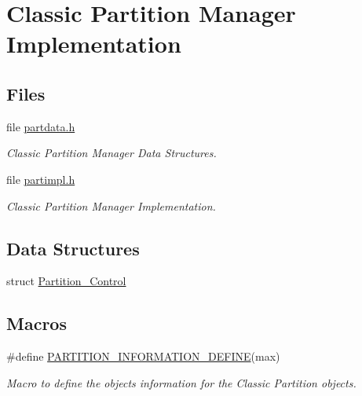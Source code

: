 \hypertarget{group__ClassicPartImpl}{}\section{Classic Partition Manager Implementation}
\label{group__ClassicPartImpl}
\subsection*{Files}
\begin{DoxyCompactItemize}
\item 
file \mbox{\hyperlink{partdata_8h}{partdata.\+h}}
\begin{DoxyCompactList}\small\item\em Classic Partition Manager Data Structures. \end{DoxyCompactList}\item 
file \mbox{\hyperlink{partimpl_8h}{partimpl.\+h}}
\begin{DoxyCompactList}\small\item\em Classic Partition Manager Implementation. \end{DoxyCompactList}\end{DoxyCompactItemize}
\subsection*{Data Structures}
\begin{DoxyCompactItemize}
\item 
struct \mbox{\hyperlink{structPartition__Control}{Partition\+\_\+\+Control}}
\end{DoxyCompactItemize}
\subsection*{Macros}
\begin{DoxyCompactItemize}
\item 
\#define \mbox{\hyperlink{group__ClassicPartImpl_ga0880148e8498428e5edc83d1428f1045}{P\+A\+R\+T\+I\+T\+I\+O\+N\+\_\+\+I\+N\+F\+O\+R\+M\+A\+T\+I\+O\+N\+\_\+\+D\+E\+F\+I\+NE}}(max)
\begin{DoxyCompactList}\small\item\em Macro to define the objects information for the Classic Partition objects. \end{DoxyCompactList}\end{DoxyCompactItemize}
